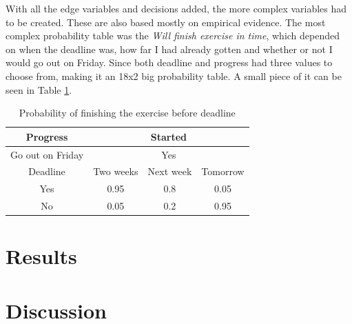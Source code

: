 \documentclass{article}
\begin{document}
    With all the edge variables and decisions added, the more complex variables
    had to be created. These are also based mostly on empirical evidence. The
    most complex probability table was the \emph{Will finish exercise in time},
    which depended on when the deadline was, how far I had already gotten and
    whether or not I would go out on Friday. Since both deadline and progress
    had three values to choose from, making it an 18x2 big probability table. A
    small piece of it can be seen in Table \ref{tab:prob}.

    \begin{table}[ht!]
        \centering
        \begin{tabular}{| c | c | c | c |}\hline
            Progress & \multicolumn{3}{|c|}{Started}\\ \hline

            Go out on Friday & \multicolumn{3}{|c|}{Yes} \\ \hline

            Deadline & Two weeks & Next week & Tomorrow\\ \hline

            Yes & 0.95 & 0.8 & 0.05\\ \hline

            No & 0.05 & 0.2 & 0.95\\ \hline
        \end{tabular}
        \caption{Probability of finishing the exercise before deadline}
        \label{tab:prob}
    \end{table}




\section*{Results}
    \blindtext

\section*{Discussion}
    \blindtext



\end{document}
